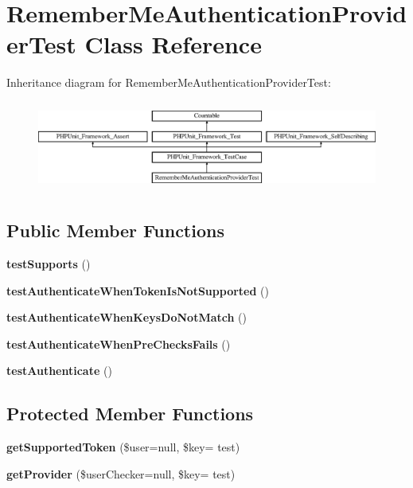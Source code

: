 \section{Remember\+Me\+Authentication\+Provider\+Test Class Reference}
\label{class_symfony_1_1_component_1_1_security_1_1_core_1_1_tests_1_1_authentication_1_1_provider_1_1_e8eb190eb6e573984b34dc27bb2048ce}
Inheritance diagram for Remember\+Me\+Authentication\+Provider\+Test\+:\begin{figure}[H]
\begin{center}
\leavevmode
\includegraphics[height=2.998662cm]{class_symfony_1_1_component_1_1_security_1_1_core_1_1_tests_1_1_authentication_1_1_provider_1_1_e8eb190eb6e573984b34dc27bb2048ce}
\end{center}
\end{figure}
\subsection*{Public Member Functions}
\begin{DoxyCompactItemize}
\item 
{\bf test\+Supports} ()
\item 
{\bf test\+Authenticate\+When\+Token\+Is\+Not\+Supported} ()
\item 
{\bf test\+Authenticate\+When\+Keys\+Do\+Not\+Match} ()
\item 
{\bf test\+Authenticate\+When\+Pre\+Checks\+Fails} ()
\item 
{\bf test\+Authenticate} ()
\end{DoxyCompactItemize}
\subsection*{Protected Member Functions}
\begin{DoxyCompactItemize}
\item 
{\bf get\+Supported\+Token} (\$user=null, \$key= \textquotesingle{}test\textquotesingle{})
\item 
{\bf get\+Provider} (\$user\+Checker=null, \$key= \textquotesingle{}test\textquotesingle{})
\end{DoxyCompactItemize}
